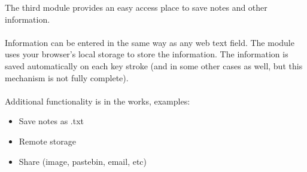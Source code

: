 \documentclass{beamer}
\begin{document}
\begin{frame}
The third module provides an easy access place to save notes and other information.
\\~\\
Information can be entered in the same way as any web text field. The module uses your browser's local storage to store the information. The information is saved automatically on each key stroke (and in some other cases as well, but this mechanism is not fully complete).
\\~\\
Additional functionality is in the works, examples:
\begin{itemize}
\item Save notes as .txt
\item Remote storage
\item Share (image, pastebin, email, etc)
\end{itemize}
\end{frame}
\end{document}
